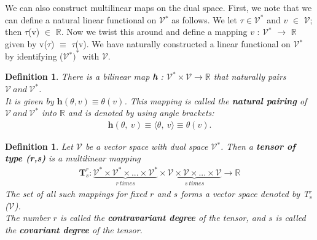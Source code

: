 \documentclass[12pt,a4paper]{article}
\newtheorem{defn}[thm]{Definition}
\begin{document}
We can also construct multilinear maps on the dual space. First, we note
that we can define a natural linear functional on $\mathcal{V}$$^*$ as follows. We let $\tau \in \mathcal{V}^* $
and $v$ $\in$ $\mathcal{V}$; then $\tau$(v) $\in$ $\mathbb{R}$. Now we twist this around and define a mapping
$v$ : $\mathcal{V}$$^*$ $\to$ $\mathbb{R}$ given by v($\tau$) $\equiv$ $\tau$(v). We have naturally constructed a linear functional on $\mathcal{V}$$^*$ by
identifying ($\mathcal{V}$$^*)^*$ with $\mathcal{V}$.
\begin{defn}
There is a bilinear map \textbf{h} : $\mathcal{V}^* \times \mathcal{V} \to \mathbb{R}$ that naturally pairs $\mathcal{V} \ and \ \mathcal{V}^*$.\\
It is given by $\textbf{h} (\theta, v) \equiv \theta(v)$. This mapping is called the \textbf{natural pairing} of $\mathcal{V} \ and 
\ \mathcal{V}^*$ into $\mathbb{R}$ and is denoted by using angle brackets:
\begin{align*}
\textbf{h}(\theta, \ v) \equiv \langle \theta, \  v \rangle \equiv \theta (v).
\end{align*}
\end{defn}
\begin{defn}
Let $\mathcal{V}$ be a vector space with dual space $\mathcal{V}$$^*$. Then a \textbf{tensor of type (r,s)} is a multilinear mapping
\begin{align*}
\textbf{T} ^r_s:\underbrace{\mathcal{V}^*\times \mathcal{V}^*\times ... \times \mathcal{V}^*}_{r\ times}\times\underbrace{\mathcal{V}\times \mathcal{V}\times...\times \mathcal{V}}_{s\ times} \to \mathbb{R}
\end{align*}
The set of all such mappings for fixed $r$ and $s$ forms a vector space denoted
by T$^r_s$ ($\mathcal{V}$). \\The number $r$ is called the \textbf{contravariant degree} of the tensor,
and $s$ is called the \textbf{covariant degree} of the tensor.\\\\
\end{defn}
\end{document}
